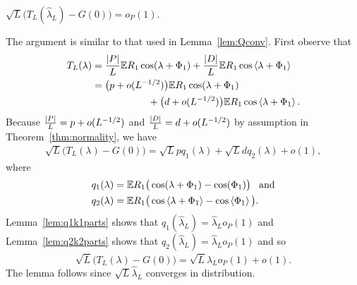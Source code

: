 \documentclass[draftcls, onecolumn, 11pt]{IEEEtran}
\begin{document}
\begin{lemma}\label{lem:HLtoG} $\sqrt{L}\big( T_L(\hat{\lambda}_L) - G(0) \big) = o_P(1)$.
\end{lemma}
\begin{IEEEproof}
The argument is similar to that used in Lemma~\ref{lem:Qconv}.  First observe that
\begin{align*}
T_L(\lambda) &= \frac{{\vert P \vert}}{L}{\mathbb E} R_1\cos(\lambda + \Phi_1) + \frac{{\vert D \vert}}{L} {\mathbb E} R_1\cos\left\langle \lambda + \Phi_1 \right\rangle \\
&=  \big( p + o(L^{-1/2}) \big) {\mathbb E} R_1\cos(\lambda + \Phi_1) \\
&\hspace{2cm} + \big( d + o(L^{-1/2}) \big) {\mathbb E} R_1\cos\left\langle \lambda + \Phi_1 \right\rangle.
\end{align*}
Because $\tfrac{{\left\vert P \right\vert}}{L} = p + o(L^{-1/2})$ and $\tfrac{{\left\vert D \right\vert}}{L} = d + o(L^{-1/2})$ by assumption in Theorem~\ref{thm:normality}, we have
\begin{align*}
\sqrt{L}\big( T_L(\lambda) - G(0) \big) = \sqrt{L}p q_1(\lambda) + \sqrt{L} d q_2(\lambda) + o(1),
\end{align*}
where
\begin{align}
q_1(\lambda) &= {\mathbb E} R_1\big( \cos(\lambda + \Phi_1) - \cos(\Phi_1) \big) \;\;\; \text{and} \nonumber \\
q_2(\lambda) &= {\mathbb E} R_1\big( \cos\left\langle \lambda + \Phi_1 \right\rangle - \cos\left\langle \Phi_1 \right\rangle \big). \label{eq:q2def}
\end{align}
Lemma~\ref{lem:q1k1parts} shows that $q_1(\hat{\lambda}_L) = \hat{\lambda}_Lo_P(1)$ and Lemma~\ref{lem:q2k2parts} shows that $q_2(\hat{\lambda}_L) = \hat{\lambda}_L o_P(1)$ and so
\[
\sqrt{L}\big( T_L(\lambda) - G(0) \big) =\sqrt{L}\hat{\lambda}_L o_P(1) + o(1).
\]
The lemma follows since $\sqrt{L}\hat{\lambda}_L$ converges in distribution.
\end{IEEEproof}
\end{document}
